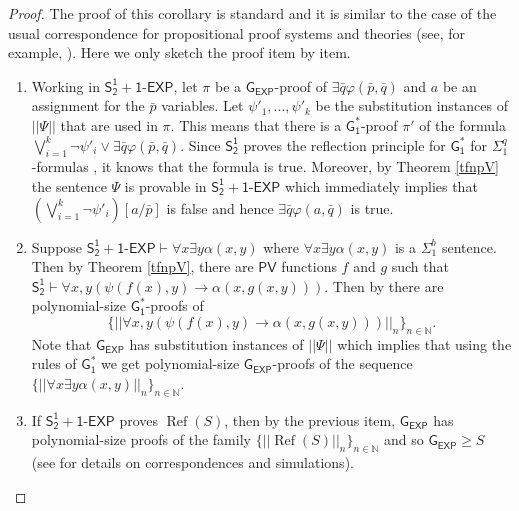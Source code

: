 \documentclass[11pt]{article}
\newcommand{\SOT}{\mathsf{S^1_2}}
\renewcommand{\PV}{\mathsf{PV}}
\newcommand{\SOTEXP}{\mathsf{S^1_2} + \mathsf{1\textsf{-}EXP}}
\newcommand{\GOS}{\mathsf{G^*_1}}
\def\GE{\mathsf{G_{EXP}}}
\def\refprop{\operatorname{Ref}}
\theoremstyle{definition}
\theoremstyle{plain}
\theoremstyle{remark}
\newcommand{\bN}{\mathbb{N}}
\begin{document}
\begin{proof}
    The proof of this corollary is standard and it is similar to the case of the usual correspondence for propositional proof systems and theories (see, for example, \cite{Pud20}). Here we only sketch the proof item by item.
    \begin{enumerate}[label=(\roman*)]
        \item Working in $\SOTEXP$, let $\pi$ be a $\GE$-proof of $\exists\bar{q}\varphi(\bar{p},\bar{q})$ and $a$ be an assignment for the $\bar{p}$ variables. Let $\psi'_1,...,\psi'_k$ be the substitution instances of $||\Psi||$ that are used in $\pi$. This means that there is a $\GOS$-proof $\pi'$ of the formula $\bigvee^k_{i=1}\neg\psi'_i\lor \exists\bar{q}\varphi(\bar{p},\bar{q})$. Since $\SOT$ proves the reflection principle for $\GOS$ for $\Sigma^q_1$-formulas \cite{krajicek95}, it knows that the formula is true.
        Moreover, by Theorem \ref{tfnpV} the sentence $\Psi$ is provable in $\SOTEXP$ which immediately implies that $\left(\bigvee^k_{i=1}\neg\psi'_i\right)[a/\bar{p}]$ is false and hence %
        $\exists\bar{q} \varphi(a,\bar{q})$ is true.
        \item Suppose $\SOTEXP\vdash \forall x \exists y\alpha(x,y)$ where $\forall x \exists y\alpha(x,y)$ is a $\Sigma^b_1$ sentence. Then by Theorem \ref{tfnpV}, there are $\PV$ functions $f$ and $g$ such that $\SOT\vdash \forall x,y(\psi(f(x),y)\to \alpha(x,g(x,y)))$. Then by  there are polynomial-size $\GOS$-proofs of $$\{||\forall x,y(\psi(f(x),y)\to \alpha(x,g(x,y)))||_n\}_{n\in\bN}.$$ Note that $\GE$ has substitution instances of $||\Psi||$ which implies that using the rules of $\GOS$ we get polynomial-size $\GE$-proofs of the sequence $\{||\forall x\exists y\alpha(x,y)||_n\}_{n\in\bN}$.
        \item If $\SOTEXP$ proves $\refprop(S)$, then by the previous item, $\GE$ has polynomial-size proofs of the family $\{||\refprop(S)||_n\}_{n\in\bN}$ and so $\GE\geq S$ (see  for details on correspondences and simulations).
    \end{enumerate}
\end{proof}
\end{document}
